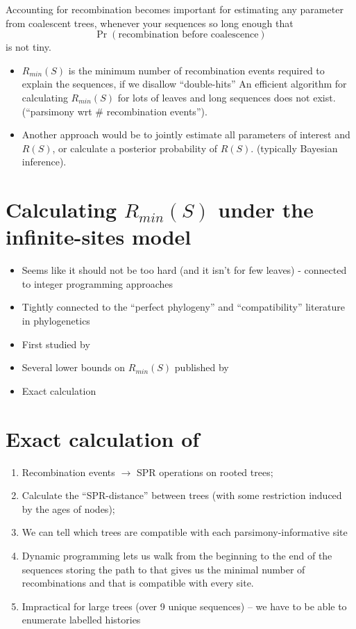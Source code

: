 \documentclass[landscape]{foils}
\begin{document}
\myNewSlide
Accounting for recombination becomes important for estimating any parameter from coalescent trees,
whenever your sequences so long enough that $$\Pr(\mbox{recombination before coalescence})$$ is not tiny.

\begin{itemize}
	\item $R_{min}(S)$ is the minimum number of recombination events required to explain the sequences, if we disallow ``double-hits''
An efficient algorithm for calculating $R_{min}(S)$ for lots of leaves and long sequences does not exist. (``parsimony wrt \# recombination events'').
	\item Another approach would be to jointly estimate all parameters of interest and $R(S)$, or calculate a posterior probability of $R(S)$. (typically Bayesian inference).
\end{itemize}

\myNewSlide
\section*{Calculating $R_{min}(S)$ under the infinite-sites model}
\begin{itemize}
	\item Seems like it should not be too hard (and it isn't for few leaves) - connected to integer programming approaches
	\item Tightly connected to the ``perfect phylogeny'' and ``compatibility'' literature in phylogenetics
	\item First studied by \citet{HudsonK1985}
	\item Several lower bounds on $R_{min}(S)$ published by \citet{MyersG2003,SongH2004}
	\item Exact calculation \citet{Hein1990,Hein1993,SongH2003}
\end{itemize}

\myNewSlide
\section*{Exact calculation of \citet{SongH2004}}
\begin{enumerate}
	\item Recombination events $\rightarrow$ SPR operations on rooted trees;
	\item Calculate the ``SPR-distance'' between trees (with some restriction induced by the ages of nodes);
	\item We can tell which trees are compatible with each parsimony-informative site
	\item Dynamic programming lets us walk from the beginning to the end of the sequences storing the path to that gives us the minimal number of recombinations and that is compatible with every site.
	\item Impractical for large trees (over 9 unique sequences) -- we have to be able to enumerate labelled histories
\end{enumerate}
\end{document}
